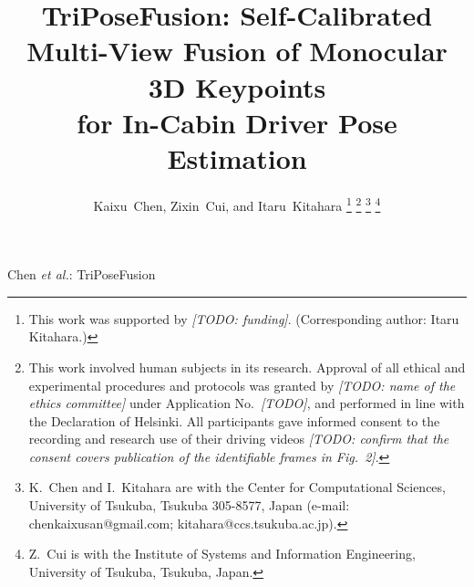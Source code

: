 \documentclass[journal]{IEEEtran}
\begin{document}
\title{TriPoseFusion: Self-Calibrated Multi-View Fusion of Monocular 3D Keypoints\\for In-Cabin Driver Pose Estimation}

\author{Kaixu~Chen, Zixin~Cui, and Itaru~Kitahara%
\thanks{This work was supported by \emph{[TODO: funding]}. (Corresponding author: Itaru Kitahara.)}%
\thanks{This work involved human subjects in its research. Approval of all ethical and experimental procedures and protocols was granted by \emph{[TODO: name of the ethics committee]} under Application No.~\emph{[TODO]}, and performed in line with the Declaration of Helsinki. All participants gave informed consent to the recording and research use of their driving videos \emph{[TODO: confirm that the consent covers publication of the identifiable frames in Fig.~2]}.}%
\thanks{K.~Chen and I.~Kitahara are with the Center for Computational Sciences, University of Tsukuba, Tsukuba 305-8577, Japan (e-mail: chenkaixusan@gmail.com; kitahara@ccs.tsukuba.ac.jp).}%
\thanks{Z.~Cui is with the Institute of Systems and Information Engineering, University of Tsukuba, Tsukuba, Japan.}%
}

%
{Chen \MakeLowercase{\textit{et al.}}: TriPoseFusion}

\maketitle
\end{document}
